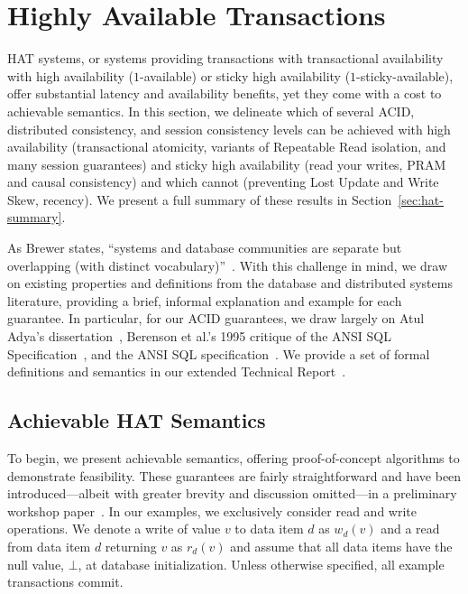 
\section{Highly Available Transactions}
\label{sec:hats}

HAT systems, or systems providing transactions with transactional
availability with high availability ($1$-available) or sticky high
availability ($1$-sticky-available), offer substantial latency and
availability benefits, yet they come with a cost to achievable
semantics. In this section, we delineate which of several ACID,
distributed consistency, and session consistency levels can be
achieved with high availability (transactional atomicity, variants of
Repeatable Read isolation, and many session guarantees) and sticky
high availability (read your writes, PRAM and causal consistency) and
which cannot (preventing Lost Update and Write Skew, recency).  We
present a full summary of these results in
Section~\ref{sec:hat-summary}.

As Brewer states, ``systems and database communities are separate but
overlapping (with distinct vocabulary)''~\cite{brewer-slides}. With
this challenge in mind, we draw on existing properties and definitions
from the database and distributed systems literature, providing a
brief, informal explanation and example for each guarantee. In
particular, for our ACID guarantees, we draw largely on Atul Adya's
dissertation~\cite{adya}, Berenson et al.'s 1995 critique of the ANSI
SQL Specification~\cite{ansicritique}, and the ANSI SQL
specification~\cite{ansi-sql}. We provide a set of formal definitions
and semantics in our extended Technical Report~\cite{hat-tr}.


\subsection{Achievable HAT Semantics}

To begin, we present achievable semantics, offering proof-of-concept
algorithms to demonstrate feasibility. These guarantees are fairly
straightforward and have been introduced---albeit with greater brevity
and discussion omitted---in a preliminary workshop
paper~\cite{hat-hotos}. In our examples, we exclusively consider read
and write operations. We denote a write of value $v$ to data item $d$
as $w_d(v)$ and a read from data item $d$ returning $v$ as $r_d(v)$
and assume that all data items have the null value, $\bot$, at
database initialization. Unless otherwise specified, all example
transactions commit.

